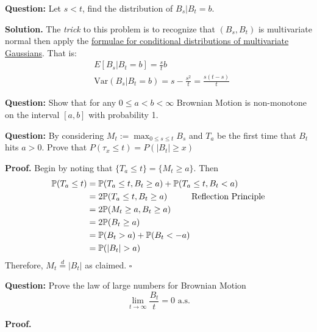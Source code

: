 \documentclass{article}
\begin{document}
\begin{tcolorbox}[colframe=black,colback=gray!5,boxrule=0.5pt]
\textbf{Question:} Let $s < t$, find the distribution of $B_s | B_t = b$.
\end{tcolorbox}
\textbf{Solution.} The \textit{trick} to this problem is to recognize that $(B_s, B_t)$ is multivariate normal then apply the \href{https://online.stat.psu.edu/stat505/lesson/6/6.1}{formulae for conditional distributions of multivariate Gaussians}. That is: 
\begin{align*}
    & E[B_s | B_t=b] = \frac{s}{t}b \\
    &\text{Var}(B_s | B_t=b) = s-\frac{s^2}{t} = \frac{s(t-s)}{t}
\end{align*}

\begin{tcolorbox}[colframe=black,colback=gray!5,boxrule=0.5pt]
\textbf{Question:} Show that for any $0\leq a < b<\infty$ Brownian Motion is non-monotone on the interval $[a,b]$ with probability 1.  
\end{tcolorbox}


\begin{tcolorbox}[colframe=black,colback=gray!5,boxrule=0.5pt]
\textbf{Question:} By considering $M_t := \max_{0\leq s \leq t} B_s$ and $T_a$ be the first time that $B_t$ hits $a > 0$. Prove that $P(\tau_x\leq t) = P(|B_t|\geq x)$  
\end{tcolorbox}
\textbf{Proof.} Begin by noting that $\{T_a\leq t\} = \{M_t\geq a\}$. Then
\begin{align*}
    \mathbb{P}(T_a\leq t) &= \mathbb{P}(T_a\leq t, B_t\geq a) + \mathbb{P}(T_a\leq t, B_t< a) \\
    &= 2\mathbb{P}(T_a\leq t, B_t\geq a) \hspace{10mm} \text{Reflection Principle} \\
    &= 2\mathbb{P}(M_t\geq a, B_t\geq a) \\
    &= 2\mathbb{P}(B_t\geq a) \\
    &= \mathbb{P}(B_t> a) + \mathbb{P}(B_t <-a) \\
    &= \mathbb{P}(|B_t| > a)
\end{align*}
Therefore, $M_t \stackrel{d}{=} |B_t|$ as claimed. $\square$

\begin{tcolorbox}[colframe=black,colback=gray!5,boxrule=0.5pt]
\textbf{Question:} Prove the law of large numbers for Brownian Motion
$$\lim_{t\to\infty}\frac{B_t}{t} = 0 \text{ a.s.}$$
\end{tcolorbox}
\textbf{Proof.}
\end{document}
